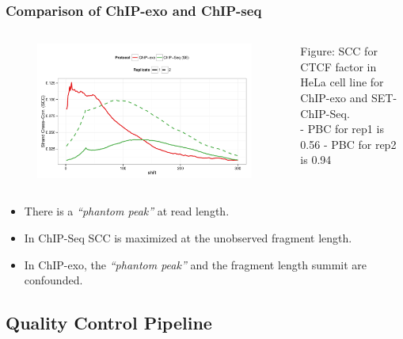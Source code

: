 \documentclass[compress,table,xcolor=dvipsnames]{beamer}\usepackage[]{graphicx}\usepackage[]{color}
\begin{document}
\begin{frame}[t]
  \frametitle{Comparison of ChIP-exo and ChIP-seq}  
\begin{columns}
\begin{figure}[H]
  \centering  
\includegraphics[width = .9\textwidth]{../figs/for_paper/scc_ctcf.pdf}
\end{figure}

  \begin{minipage}[c][.6\textheight][c]{\linewidth}
{\small
  {\color{RoyalBlue}Figure:} SCC for CTCF factor in HeLa cell line for
    ChIP-exo and SET-ChIP-Seq.\\
    - {\color{ForestGreen} PBC for rep1 is 0.56}
    - {\color{ForestGreen} PBC for rep2 is 0.94}
  }
\end{minipage}
\end{columns}

{\small
\begin{itemize}
\item There is a \emph{``phantom peak''} at read length.
\item In ChIP-Seq SCC is maximized at the unobserved fragment length.
\item In ChIP-exo, the \emph{``phantom peak''} and the fragment length
  summit are confounded.
\end{itemize}
}
\end{frame}

\subsection{Quality Control Pipeline}
\end{document}

